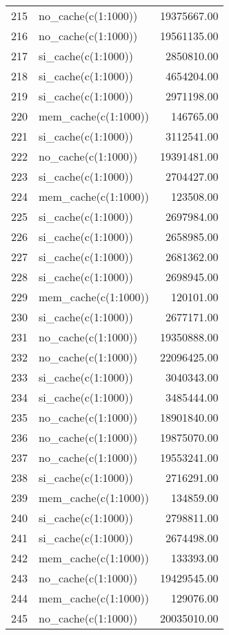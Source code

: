 \begin{table}[ht]
\begin{tabular}{rlr}
  215 & no\_cache(c(1:1000)) & 19375667.00 \\ 
  216 & no\_cache(c(1:1000)) & 19561135.00 \\ 
  217 & si\_cache(c(1:1000)) & 2850810.00 \\ 
  218 & si\_cache(c(1:1000)) & 4654204.00 \\ 
  219 & si\_cache(c(1:1000)) & 2971198.00 \\ 
  220 & mem\_cache(c(1:1000)) & 146765.00 \\ 
  221 & si\_cache(c(1:1000)) & 3112541.00 \\ 
  222 & no\_cache(c(1:1000)) & 19391481.00 \\ 
  223 & si\_cache(c(1:1000)) & 2704427.00 \\ 
  224 & mem\_cache(c(1:1000)) & 123508.00 \\ 
  225 & si\_cache(c(1:1000)) & 2697984.00 \\ 
  226 & si\_cache(c(1:1000)) & 2658985.00 \\ 
  227 & si\_cache(c(1:1000)) & 2681362.00 \\ 
  228 & si\_cache(c(1:1000)) & 2698945.00 \\ 
  229 & mem\_cache(c(1:1000)) & 120101.00 \\ 
  230 & si\_cache(c(1:1000)) & 2677171.00 \\ 
  231 & no\_cache(c(1:1000)) & 19350888.00 \\ 
  232 & no\_cache(c(1:1000)) & 22096425.00 \\ 
  233 & si\_cache(c(1:1000)) & 3040343.00 \\ 
  234 & si\_cache(c(1:1000)) & 3485444.00 \\ 
  235 & no\_cache(c(1:1000)) & 18901840.00 \\ 
  236 & no\_cache(c(1:1000)) & 19875070.00 \\ 
  237 & no\_cache(c(1:1000)) & 19553241.00 \\ 
  238 & si\_cache(c(1:1000)) & 2716291.00 \\ 
  239 & mem\_cache(c(1:1000)) & 134859.00 \\ 
  240 & si\_cache(c(1:1000)) & 2798811.00 \\ 
  241 & si\_cache(c(1:1000)) & 2674498.00 \\ 
  242 & mem\_cache(c(1:1000)) & 133393.00 \\ 
  243 & no\_cache(c(1:1000)) & 19429545.00 \\ 
  244 & mem\_cache(c(1:1000)) & 129076.00 \\ 
  245 & no\_cache(c(1:1000)) & 20035010.00 \\ 

\end{tabular}
\end{table}

